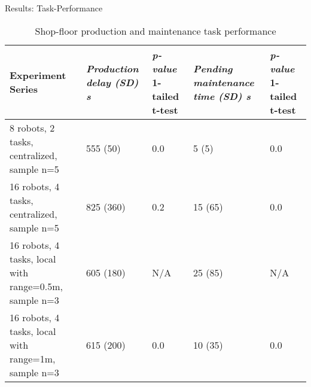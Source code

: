 \documentclass{beamer}
\begin{document}
\begin{frame}[t]{Results: Task-Performance}
\begin{table}
\begin{scriptsize}
\begin{center}
\caption{Shop-floor production and maintenance task performance}
\begin{tabular}{|m{1.2in}|p{0.6in}|p{0.6in}|p{0.6in}|p{0.6in}|}
\hline Experiment Series & \textit{Production \protect\newline delay (SD) s} & \textit{p-value} 1-tailed t-test & \textit{Pending \protect\newline maintenance time (SD) s} & \textit{p-value} 1-tailed t-test\\ 
\hline \alert{8 robots, 2 tasks, \protect\newline centralized, sample n=5 } & 
555 (50) & 0.0 & 5 (5) & 0.0\\ 
\hline \alert{16 robots, 4 tasks, \protect\newline centralized, sample n=5  } & 825 (360) & 0.2 & 15 (65) & 0.0 \\
\hline \alert{16 robots, 4 tasks, \protect\newline local  with range=0.5m, sample n=3} & 605 (180) & N/A & 25 (85) & N/A\\
\hline \alert{16 robots, 4 tasks, \protect\newline local with range=1m, sample n=3}  & 615 (200) & 0.0 & 10 (35) & 0.0\\
\hline
\end{tabular}
\label{table:motion-cmp} 
\end{center}
\end{scriptsize}
\end{table}
\end{frame}
\end{document}
